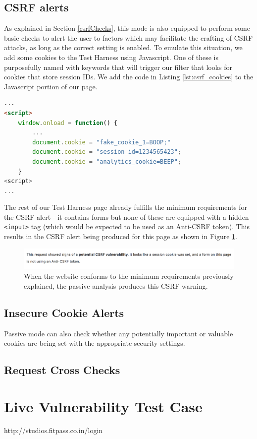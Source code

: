 \subsection{CSRF alerts}

As explained in Section \ref{csrfChecks}, this mode is also equipped to perform some basic checks to alert the user to factors which may facilitate the crafting of CSRF attacks, as long as the correct setting is enabled. To emulate this situation, we add some cookies to the Test Harness using Javascript. One of these is purposefully named with keywords that will trigger our filter that looks for cookies that store session IDs. We add the code in Listing \ref{lst:csrf_cookies} to the Javascript portion of our page.

\begin{lstlisting}[label={lst:csrf_cookies}, language={HTML}, caption={We add some cookies to the page - one of these is designed to trigger our filter to find Session ID related cookies}]
...
<script>
	window.onload = function() {
		...
		document.cookie = "fake_cookie_1=BOOP;"
		document.cookie = "session_id=1234565423";
		document.cookie = "analytics_cookie=BEEP";
	}
<script>
...
\end{lstlisting}

The rest of our Test Harness page already fulfills the minimum requirements for the CSRF alert - it contains forms but none of these are equipped with a hidden \texttt{<input>} tag (which would be expected to be used as an Anti-CSRF token). This results in the CSRF alert being produced for this page as shown in Figure \ref{fig:csrf_warning}.

\begin{figure}[h!]
	\centering
	\includegraphics[width=\textwidth]{images/csrf_warning.png}
	\caption{When the website conforms to the minimum requirements previously explained, the passive analysis produces this CSRF warning.}
	\label{fig:csrf_warning}
\end{figure}

\subsection{Insecure Cookie Alerts}

Passive mode can also check whether any potentially important or valuable cookies are being set with the appropriate security settings. 

\subsection{Request Cross Checks}


\section{Live Vulnerability Test Case}

http://studios.fitpass.co.in/login





















